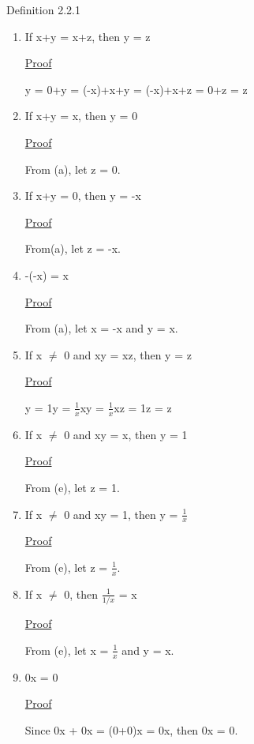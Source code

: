 { \color{blue} Definition 2.2.1 }
\begin{enumerate}[label=(\alph*), leftmargin=2cm]
	\item If x+y = x+z, then y = z

		{ \color{magenta} \underline{Proof}  }
		
		\qquad y = 0+y = (-x)+x+y = (-x)+x+z = 0+z = z
	
	\item If x+y = x, then y = 0

		{ \color{magenta} \underline{Proof} }

		\qquad From (a), let z = 0.
	
	\item If x+y = 0, then y = -x
	
		{ \color{magenta} \underline{Proof} }

		\qquad From(a), let z = -x.
	
	\item -(-x) = x

		{ \color{magenta} \underline{Proof} }

		\qquad From (a), let x = -x and y = x.
	
	\item If x $\not =$ 0 and xy = xz, then y = z

		{ \color{magenta} \underline{Proof} } 
		
		\qquad y = 1y = $\frac{1}{x}$xy = $\frac{1}{x}$xz = 1z = z 
	
	\item If x $\not =$ 0 and xy = x, then y = 1

		{ \color{magenta} \underline{Proof} } 
		
		\qquad From (e), let z = 1.
	
	\item If x $\not =$ 0 and xy = 1, then y = $\frac{1}{x}$

		{ \color{magenta} \underline{Proof} } 
		
		\qquad From (e), let z = $\frac{1}{x}$.
	
	\item If x $\not =$ 0, then $\frac{1}{1/x}$ = x

		{ \color{magenta} \underline{Proof} } 
		
		\qquad From (e), let x = $\frac{1}{x}$ and y = x.
	
	\item 0x = 0

		{ \color{magenta} \underline{Proof} } 
		
		\qquad Since 0x + 0x = (0+0)x = 0x, then 0x = 0.
	

\end{enumerate}
